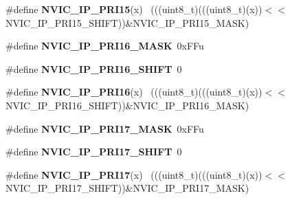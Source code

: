 \begin{DoxyCompactItemize}
\item 
\hypertarget{group___n_v_i_c___register___masks_ga79d1863e55a6b3b44e77bb2cb2b9b74d}{}\#define {\bfseries N\+V\+I\+C\+\_\+\+I\+P\+\_\+\+P\+R\+I15}(x)                                              ~(((uint8\+\_\+t)(((uint8\+\_\+t)(x))$<$$<$N\+V\+I\+C\+\_\+\+I\+P\+\_\+\+P\+R\+I15\+\_\+\+S\+H\+I\+F\+T))\&N\+V\+I\+C\+\_\+\+I\+P\+\_\+\+P\+R\+I15\+\_\+\+M\+A\+S\+K)\label{group___n_v_i_c___register___masks_ga79d1863e55a6b3b44e77bb2cb2b9b74d}

\item 
\hypertarget{group___n_v_i_c___register___masks_gacdb2ba49f70d44f5014cf3d227a8f624}{}\#define {\bfseries N\+V\+I\+C\+\_\+\+I\+P\+\_\+\+P\+R\+I16\+\_\+\+M\+A\+S\+K}~0x\+F\+Fu\label{group___n_v_i_c___register___masks_gacdb2ba49f70d44f5014cf3d227a8f624}

\item 
\hypertarget{group___n_v_i_c___register___masks_ga549bcef41863e0037ef4d53c3a5ad38c}{}\#define {\bfseries N\+V\+I\+C\+\_\+\+I\+P\+\_\+\+P\+R\+I16\+\_\+\+S\+H\+I\+F\+T}~0\label{group___n_v_i_c___register___masks_ga549bcef41863e0037ef4d53c3a5ad38c}

\item 
\hypertarget{group___n_v_i_c___register___masks_gade74f304d5879761129f2258a73a1b0d}{}\#define {\bfseries N\+V\+I\+C\+\_\+\+I\+P\+\_\+\+P\+R\+I16}(x)                                              ~(((uint8\+\_\+t)(((uint8\+\_\+t)(x))$<$$<$N\+V\+I\+C\+\_\+\+I\+P\+\_\+\+P\+R\+I16\+\_\+\+S\+H\+I\+F\+T))\&N\+V\+I\+C\+\_\+\+I\+P\+\_\+\+P\+R\+I16\+\_\+\+M\+A\+S\+K)\label{group___n_v_i_c___register___masks_gade74f304d5879761129f2258a73a1b0d}

\item 
\hypertarget{group___n_v_i_c___register___masks_gadb5750380dd5143e80ef816a92fb05c6}{}\#define {\bfseries N\+V\+I\+C\+\_\+\+I\+P\+\_\+\+P\+R\+I17\+\_\+\+M\+A\+S\+K}~0x\+F\+Fu\label{group___n_v_i_c___register___masks_gadb5750380dd5143e80ef816a92fb05c6}

\item 
\hypertarget{group___n_v_i_c___register___masks_gaeda811db4c0f1df5af9afc734ef1b959}{}\#define {\bfseries N\+V\+I\+C\+\_\+\+I\+P\+\_\+\+P\+R\+I17\+\_\+\+S\+H\+I\+F\+T}~0\label{group___n_v_i_c___register___masks_gaeda811db4c0f1df5af9afc734ef1b959}

\item 
\hypertarget{group___n_v_i_c___register___masks_ga162ac5ece979d9b8f76ad8d6baa9d085}{}\#define {\bfseries N\+V\+I\+C\+\_\+\+I\+P\+\_\+\+P\+R\+I17}(x)                                              ~(((uint8\+\_\+t)(((uint8\+\_\+t)(x))$<$$<$N\+V\+I\+C\+\_\+\+I\+P\+\_\+\+P\+R\+I17\+\_\+\+S\+H\+I\+F\+T))\&N\+V\+I\+C\+\_\+\+I\+P\+\_\+\+P\+R\+I17\+\_\+\+M\+A\+S\+K)\label{group___n_v_i_c___register___masks_ga162ac5ece979d9b8f76ad8d6baa9d085}


\end{DoxyCompactItemize}
